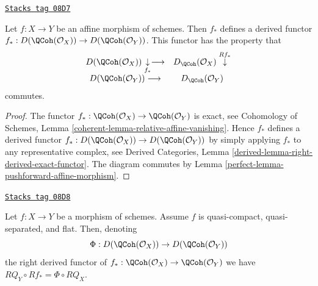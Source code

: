 \begin{lemma}
\label{perfect-lemma-affine-pushforward}
\href{https://stacks.math.columbia.edu/tag/08D7}{\texttt{Stacks tag 08D7}}

Let $f : X \to Y$ be an affine morphism of schemes.
Then $f_*$ defines a derived functor
$f_* : D(\QCoh(\mathcal{O}_X)) \to D(\QCoh(\mathcal{O}_Y))$.
This functor has the property that
$$
\begin{array}{cc}D(\QCoh(\mathcal{O}_X)) \underset{f_*}{\downarrow}\longrightarrow & D_\QCoh(\mathcal{O}_X) \overset{Rf_*}{\downarrow} \\ D(\QCoh(\mathcal{O}_Y)) \longrightarrow & D_\QCoh(\mathcal{O}_Y)\end{array}
$$
commutes.
\end{lemma}

\begin{proof}

The functor
$f_* : \QCoh(\mathcal{O}_X) \to \QCoh(\mathcal{O}_Y)$
is exact, see
Cohomology of Schemes, Lemma \ref{coherent-lemma-relative-affine-vanishing}.
Hence $f_*$ defines a derived functor
$f_* : D(\QCoh(\mathcal{O}_X)) \to D(\QCoh(\mathcal{O}_Y))$
by simply applying $f_*$ to any representative complex, see
Derived Categories, Lemma \ref{derived-lemma-right-derived-exact-functor}.
The diagram commutes by Lemma \ref{perfect-lemma-pushforward-affine-morphism}.
\end{proof}

\begin{lemma}
\label{perfect-lemma-flat-pushforward-coherator}
\href{https://stacks.math.columbia.edu/tag/08D8}{\texttt{Stacks tag 08D8}}

Let $f : X \to Y$ be a morphism of schemes. Assume $f$ is
quasi-compact, quasi-separated, and flat. Then, denoting
$$
\Phi : D(\QCoh(\mathcal{O}_X)) \to D(\QCoh(\mathcal{O}_Y))
$$
the right derived functor of
$f_* : \QCoh(\mathcal{O}_X) \to \QCoh(\mathcal{O}_Y)$
we have $RQ_Y \circ Rf_* = \Phi \circ RQ_X$.
\end{lemma}

